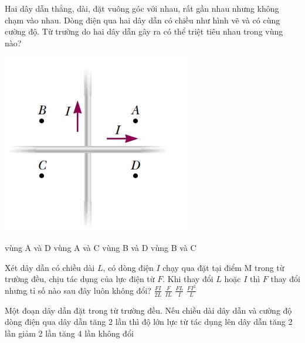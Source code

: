 \begin{ex}
	Hai dây dẫn thẳng, dài, đặt vuông góc với nhau, rất gần nhau nhưng không chạm vào nhau. Dòng điện qua hai dây dẫn có chiều như hình vẽ và có cùng cường độ. Từ trường do hai dây dẫn gây ra có thể triệt tiêu nhau trong vùng nào?
	\begin{center}
		\includegraphics[width=0.3\linewidth]{figs/VN12-Y24-PH-SYL-017P-8}
	\end{center}
	\choice
	{vùng A và D}
	{\True vùng A và C}
	{vùng B và D}
	{vùng B và C}
	\loigiai{}
\end{ex}
\begin{ex}
	Xét dây dẫn có chiều dài $L$, có dòng điện $I$ chạy qua đặt tại điểm M trong từ trường đều, chịu tác dụng của lực điện từ $F$. Khi thay đổi $L$ hoặc $I$ thì $F$ thay đổi nhưng tỉ số nào sau đây luôn không đổi?
	\choice
	{$\frac{FI}{2L}$}
	{\True $\frac{F}{IL}$}
	{$\frac{FL}{I}$}
	{$\frac{FI^2}{L}$}
	\loigiai{}
\end{ex}
\begin{ex}
	Một đoạn dây dẫn đặt trong từ trường đều. Nếu chiều dài dây dẫn và cường độ dòng điện qua dây dẫn tăng 2 lần thì độ lớn lực từ tác dụng lên dây dẫn	
	\choice
	{tăng 2 lần}
	{giảm 2 lần}
	{\True tăng 4 lần}
	{không đổi}
\end{ex}

